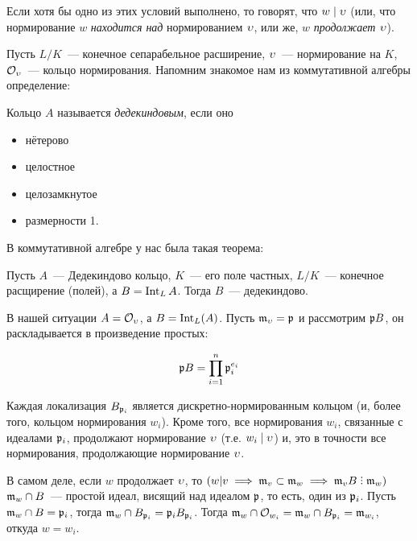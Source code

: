 	\begin{definition} 
		Если хотя бы одно из этих условий выполнено, то говорят, что $w \mid \upsilon$ (или, что нормирование $w$ \emph{находится над} нормированием $\upsilon$, или же, $w$ \emph{продолжает} $\upsilon$). 
	\end{definition}

	Пусть $L/K$~--- конечное сепарабельное расширение, $\upsilon$~--- нормирование на $K$, $\mathcal{O}_{\upsilon}$~--- кольцо нормирования. Напомним знакомое нам из коммутативной алгебры определение:

	\begin{definition} 
		Кольцо $A$ называется \emph{дедекиндовым}, если оно 
		\begin{itemize}
			\item нётерово

			\item целостное

			\item целозамкнутое 

			\item размерности 1.
		\end{itemize}
	\end{definition}

	В коммутативной алгебре у нас была такая теорема:

	\begin{theorem} 
		Пусть $A$~--- Дедекиндово кольцо, $K$~--- его поле частных, $L/K$~--- конечное расщирение (полей), а $B = \operatorname{Int}_{L}{A}$. Тогда $B$~--- дедекиндово. 
	\end{theorem}

	В нашей ситуации $A = \mathcal{O}_{\upsilon}$, а $B = \operatorname{Int}_{L}(A)$. Пусть  $\mathfrak{m}_{\upsilon} = \mathfrak{p}$ и рассмотрим $\mathfrak{p} B$, он раскладывается в произведение простых: 

	\[
		\mathfrak{p} B = \prod_{i = 1}^{n} \mathfrak{p}_{i}^{e_i} 
	\]

	Каждая локализация $B_{\mathfrak{p}_i}$ является дискретно-нормированным кольцом (и, более того, кольцом нормирования $w_i$). Кроме того, все нормирования $w_i$, связанные с идеалами $\mathfrak{p}_i$, продолжают нормирование $\upsilon$ (т.е. $w_i \mid \upsilon$) и, это в точности все нормирования, продолжающие нормирование $\upsilon$.

	В самом деле, если $w$ продолжает $\upsilon$, то $(w \vert v \implies \fm_v \subset \fm_{w} \implies \fm_{v}B \divby \fm_{w})$  $\mathfrak{m}_{w} \cap B$~--- простой идеал, висящий над идеалом $\mathfrak{p}$, то есть, один из $\mathfrak{p}_i$. Пусть $\mathfrak{m}_{w} \cap B = \mathfrak{p}_i$, тогда $\mathfrak{m}_{w} \cap B_{\mathfrak{p}_i} = \mathfrak{p}_i B_{\mathfrak{p}_i}$. Тогда $\mathfrak{m}_{w} \cap \mathcal{O}_{w_i} = \mathfrak{m}_{w} \cap B_{\mathfrak{p}_i} = \mathfrak{m}_{w_i}$, откуда $w = w_i$.

